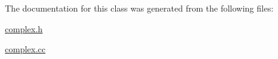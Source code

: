 The documentation for this class was generated from the following files\-:\begin{DoxyCompactItemize}
\item 
\hyperlink{complex_8h}{complex.\-h}\item 
\hyperlink{complex_8cc}{complex.\-cc}\end{DoxyCompactItemize}
